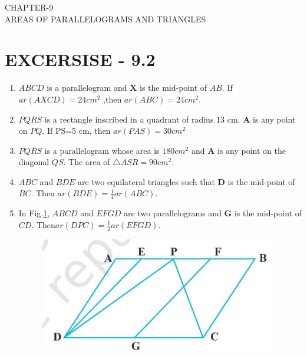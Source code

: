 \documentclass{article}
\let\vec\mathbf{}
\let\vec\mathbf
\begin{document}
\begin{center}
\textbf\large{CHAPTER-9  \\ AREAS OF PARALLELOGRAMS AND TRIANGLES}
\section*{EXCERSISE - 9.2}
\end{center}
\begin{enumerate}
\item $ABCD$ is a parallelogram and $\vec{X}$ is the mid-point of $AB$. If $ ar(AXCD)= 24 cm^2 $ ,then $ar(ABC) =  24cm^2 $.
\item $PQRS$ is a rectangle inscribed in a quadrant of radius 13 cm. $\vec{A}$ is any point on $PQ$. If PS=5 cm, then $ar(PAS)= 30 cm^2 $
\item $PQRS$ is a parallelogram whose area is $ 180 cm^2 $ and $\vec{A}$ is any point on the diagonal $QS$. The area of $\triangle ASR =90 cm^2$.
\item $ABC$ and $BDE$ are two equilateral triangles such that $\vec{D}$ is the mid-point of $BC$. Then $ar(BDE)=\frac{1}{4}  ar(ABC)$.
\item In Fig.\ref{figs:9.8.}, $ABCD$ and $EFGD$ are two parallelograms and $\vec{G}$ is the mid-point of $CD$. Then$ ar(DPC)=\frac{1}{2}  ar(EFGD)$.
\begin{figure}[h]
	\centering
	\includegraphics[width=\columnwidth]{figs/9.8.jpg}
	\caption{}
	\label{figs:9.8.}
\end{figure}

\end{enumerate}
\end{document}
